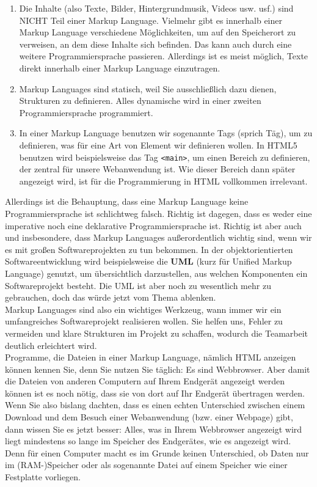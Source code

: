 \begin{enumerate}
	\item Die Inhalte (also Texte, Bilder, Hintergrundmusik, Videos usw. usf.) sind NICHT Teil einer Markup Language. Vielmehr gibt es innerhalb einer Markup Language verschiedene Möglichkeiten, um auf den Speicherort zu verweisen, an dem diese Inhalte sich befinden. Das kann auch durch eine weitere Programmiersprache passieren. Allerdings ist es meist möglich, Texte direkt innerhalb einer Markup Language einzutragen.
	\item Markup Languages sind statisch, weil Sie ausschließlich dazu dienen, Strukturen zu definieren. Alles dynamische wird in einer zweiten Programmiersprache programmiert.
	\item In einer Markup Language benutzen wir sogenannte Tags (sprich Täg), um zu definieren, was für eine Art von Element wir definieren wollen. In HTML5 benutzen wird beispielsweise das Tag \verb|<main>|, um einen Bereich zu definieren, der zentral für unsere Webanwendung ist. Wie dieser Bereich dann später angezeigt wird, ist für die Programmierung in HTML vollkommen irrelevant.
\end{enumerate}

Allerdings ist die Behauptung, dass eine Markup Language keine Programmiersprache ist schlichtweg falsch. Richtig ist dagegen, dass es weder eine imperative noch eine deklarative Programmiersprache ist. Richtig ist aber auch und insbesondere, dass Markup Languages außerordentlich wichtig sind, wenn wir es mit großen Softwareprojekten zu tun bekommen. In der objektorientierten Softwareentwicklung wird beispielsweise die \textbf{UML} (kurz für Unified Markup Language) genutzt, um übersichtlich darzustellen, aus welchen Komponenten ein Softwareprojekt besteht. Die UML ist aber noch zu wesentlich mehr zu gebrauchen, doch das würde jetzt vom Thema ablenken.\\

Markup Languages sind also ein wichtiges Werkzeug, wann immer wir ein umfangreiches Softwareprojekt realisieren wollen. Sie helfen uns, Fehler zu vermeiden und klare Strukturen im Projekt zu schaffen, wodurch die Teamarbeit deutlich erleichtert wird.\\

Programme, die Dateien in einer Markup Language, nämlich HTML anzeigen können kennen Sie, denn Sie nutzen Sie täglich: Es sind Webbrowser. Aber damit die Dateien von anderen Computern auf Ihrem Endgerät angezeigt werden können ist es noch nötig, dass sie von dort auf Ihr Endgerät übertragen werden. Wenn Sie also bislang dachten, dass es einen echten Unterschied zwischen einem Download und dem Besuch einer Webanwendung (bzw. einer Webpage) gibt, dann wissen Sie es jetzt besser: Alles, was in Ihrem Webbrowser angezeigt wird liegt mindestens so lange im Speicher des Endgerätes, wie es angezeigt wird. Denn für einen Computer macht es im Grunde keinen Unterschied, ob Daten \glqq{}nur\grqq{} im (RAM-)Speicher oder als sogenannte Datei auf einem Speicher wie einer Festplatte vorliegen.\\

